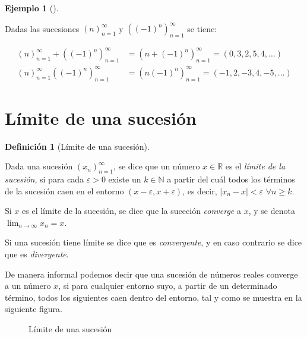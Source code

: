\documentclass[
  a4paper,
]{scrreport}
\theoremstyle{definition}
\newtheorem{example}{Ejemplo}[chapter]
\theoremstyle{plain}
\theoremstyle{definition}
\newtheorem{definition}{Definición}[chapter]
\theoremstyle{plain}
\theoremstyle{plain}
\theoremstyle{remark}
\begin{document}
\leavevmode{}%
\begin{example}[]\label{exm-operaciones-sucesiones}

Dadas las sucesiones \((n)_{n=1}^\infty\) y \(((-1)^n)_{n=1}^\infty\) se
tiene:

\begin{align*}
(n)_{n=1}^\infty + ((-1)^n)_{n=1}^\infty &= (n + (-1)^n)_{n=1}^\infty = (0, 3, 2, 5, 4, \ldots)\\
(n)_{n=1}^\infty ((-1)^n)_{n=1}^\infty &= (n (-1)^n)_{n=1}^\infty = (-1, 2, -3, 4, -5, \ldots)
\end{align*}

\end{example}

\hypertarget{luxedmite-de-una-sucesiuxf3n}{%
\section{Límite de una sucesión}\label{luxedmite-de-una-sucesiuxf3n}}

\leavevmode{}%
\begin{definition}[Límite de una sucesión]\label{def-limite-sucesion}

Dada una sucesión \((x_n)_{n=1}^\infty\), se dice que un número
\(x\in\mathbb{R}\) es el \emph{límite de la sucesión}, si para cada
\(\varepsilon>0\) existe un \(k\in\mathbb{N}\) a partir del cuál todos
los términos de la sucesión caen en el entorno
\((x-\varepsilon, x+\varepsilon)\), es decir, \(|x_n-x|<\varepsilon\)
\(\forall n\geq k\).

Si \(x\) es el límite de la sucesión, se dice que la suceción
\emph{converge} a \(x\), y se denota \(\lim_{n\to\infty}x_n = x\).

\end{definition}

Si una sucesión tiene límite se dice que es \emph{convergente}, y en
caso contrario se dice que es \emph{divergente}.

De manera informal podemos decir que una sucesión de números reales
converge a un número \(x\), si para cualquier entorno suyo, a partir de
un determinado término, todos los siguientes caen dentro del entorno,
tal y como se muestra en la siguiente figura.

\begin{figure}

{\centering 



}

\caption{Límite de una sucesión}

\end{figure}
\end{document}
